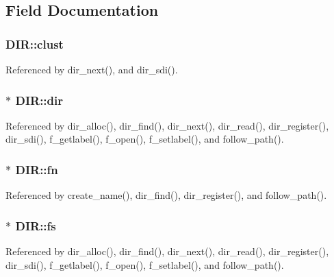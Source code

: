 \subsection{Field Documentation}
\hypertarget{structDIR_acfbb8ba2d6e73b6f999ceffd1857c190}{
\subsubsection[{clust}]{ D\-I\-R\-::clust}}\label{structDIR_acfbb8ba2d6e73b6f999ceffd1857c190}


Referenced by dir\-\_\-next(), and dir\-\_\-sdi().

\hypertarget{structDIR_a6c2a8c0cf2d55ae99775e93a16593449}{
\subsubsection[{dir}]{$\ast$ D\-I\-R\-::dir}}\label{structDIR_a6c2a8c0cf2d55ae99775e93a16593449}


Referenced by dir\-\_\-alloc(), dir\-\_\-find(), dir\-\_\-next(), dir\-\_\-read(), dir\-\_\-register(), dir\-\_\-sdi(), f\-\_\-getlabel(), f\-\_\-open(), f\-\_\-setlabel(), and follow\-\_\-path().

\hypertarget{structDIR_a32da2f31d6c3b6c42eef981cb0cfd2ee}{
\subsubsection[{fn}]{$\ast$ D\-I\-R\-::fn}}\label{structDIR_a32da2f31d6c3b6c42eef981cb0cfd2ee}


Referenced by create\-\_\-name(), dir\-\_\-find(), dir\-\_\-register(), and follow\-\_\-path().

\hypertarget{structDIR_a312eaa66cb703fb2993ea98173dc0c9a}{
\subsubsection[{fs}]{$\ast$ D\-I\-R\-::fs}}\label{structDIR_a312eaa66cb703fb2993ea98173dc0c9a}


Referenced by dir\-\_\-alloc(), dir\-\_\-find(), dir\-\_\-next(), dir\-\_\-read(), dir\-\_\-register(), dir\-\_\-sdi(), f\-\_\-getlabel(), f\-\_\-open(), f\-\_\-setlabel(), and follow\-\_\-path().

